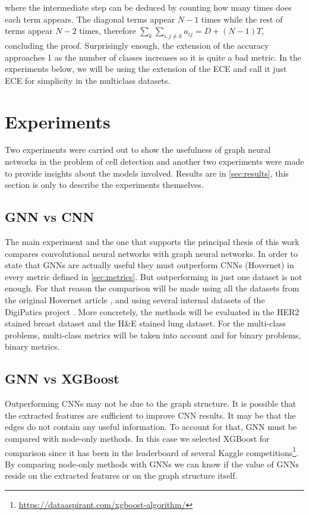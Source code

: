 where the intermediate step can be deduced by counting how many times does each term appears. The diagonal terms appear $N-1$ times while the rest of terms appear $N-2$ times, therefore $\sum_{k} \sum_{i,j\neq k} a_{ij} = D + (N-1)T$, concluding the proof. Surprisingly enough, the extension of the accuracy approaches 1 as the number of classes increases so it is quite a bad metric. In the experiments below, we will be using the extension of the ECE and call it just ECE for simplicity in the multiclass datasets.

\section{Experiments}\label{sec:exp}

Two experiments were carried out to show the usefulness of graph neural networks in the problem of cell detection and another two experiments were made to provide insights about the models involved. Results are in \autoref{sec:results}, this section is only to describe the experiments themselves. 


\subsection{GNN vs CNN}

The main experiment and the one that supports the principal thesis of this work compares convolutional neural networks with graph neural networks. In order to state that GNNs are actually useful they must outperform CNNs (Hovernet) in every metric defined in \autoref{sec:metrics}. But outperforming in just one dataset is not enough. For that reason the comparison will be made using all the datasets from the original Hovernet article \cite{hovernet, gamper2020pannuke, 8880654}, and using several internal datasets of the DigiPatics project \cite{DigiPatics2022}. More concretely, the methods will be evaluated in the HER2 stained breast dataset and the H\&E stained lung dataset. For the multi-class problems, multi-class metrics will be taken into account and for binary problems, binary metrics.

\subsection{GNN vs XGBoost}

Outperforming CNNs may not be due to the graph structure. It is possible that the extracted features are sufficient to improve CNN results. It may be that the edges do not contain any useful information. To account for that, GNN must be compared with node-only methods. In this case we selected XGBoost \cite{xgboost} for comparison since it has been in the leaderboard of several Kaggle competitions\footnote{\url{https://dataaspirant.com/xgboost-algorithm/}}. By comparing node-only methods with GNNs we can know if the value of GNNs reside on the extracted features or on the graph structure itself.

